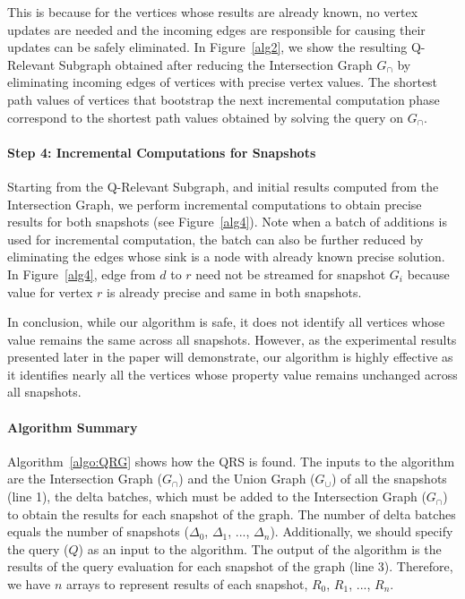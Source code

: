 \vspace{0.1in}
\noindent
This is because for the vertices whose results are already known, no vertex updates are needed and the incoming edges are responsible for causing their updates can be safely eliminated. In Figure~\ref{alg2}, we show the resulting Q-Relevant Subgraph obtained after reducing the Intersection Graph $G_{\cap}$ by eliminating incoming edges of vertices with precise vertex values. The shortest path values of vertices that bootstrap the next incremental computation phase correspond to the shortest path values obtained by solving the query on $G_\cap$.

\vspace{-0.075in}
\paragraph{Step 4: Incremental Computations for Snapshots} Starting from the Q-Relevant Subgraph, and initial results computed from the Intersection Graph, we perform incremental computations to obtain precise results for both snapshots (see Figure~\ref{alg4}). Note when a batch of additions is used for incremental computation, the batch can also be further reduced by eliminating the edges whose sink is a node with already known precise solution. In Figure~\ref{alg4}, edge from $d$ to $r$ need not be streamed for snapshot $G_i$ because value for vertex $r$ is already precise and same in both snapshots.


In conclusion, while our algorithm is safe, it does not identify all vertices whose value remains the same across all snapshots. However, as the experimental results presented later in the paper will demonstrate, our algorithm is highly effective as it identifies nearly all the vertices whose property value remains unchanged across all snapshots.



\vspace{-0.1in}
\paragraph{Algorithm Summary} Algorithm~\ref{algo:QRG} shows how the QRS is found. The inputs to the algorithm are the Intersection Graph ($G_{\cap}$) and the Union Graph ($G_{\cup}$) of all the snapshots (line 1), the delta batches, which must be added to the Intersection Graph ($G_{\cap}$) to obtain the results for each snapshot of the graph. The number of delta batches equals the number of snapshots ($\Delta_{0}$, $\Delta_{1}$, ..., $\Delta_{n}$). Additionally, we should specify the query ($Q$) as an input to the algorithm. The output of the algorithm is the results of the query evaluation for each snapshot of the graph (line 3). Therefore, we have $n$ arrays to represent results of each snapshot, $R_{0}$, $R_{1}$, ..., $R_{n}$.

